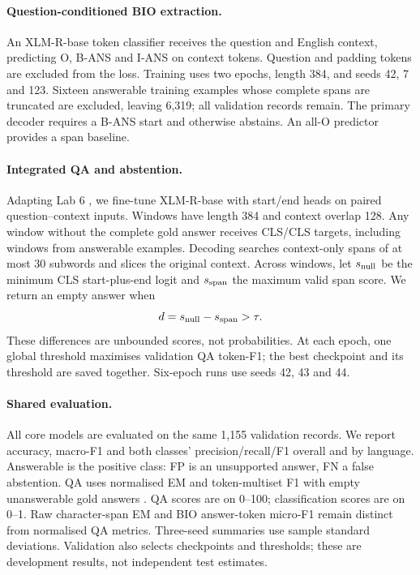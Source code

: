 \documentclass[11pt]{article}
\begin{document}
\paragraph{Question-conditioned BIO extraction.}
An XLM-R-base token classifier \citep{xlmr} receives the question and English context, predicting O, B-ANS and I-ANS on context tokens. Question and padding tokens are excluded from the loss. Training uses two epochs, length 384, and seeds 42, 7 and 123. Sixteen answerable training examples whose complete spans are truncated are excluded, leaving 6,319; all validation records remain. The primary decoder requires a B-ANS start and otherwise abstains. An all-O predictor provides a span baseline.

\paragraph{Integrated QA and abstention.}
Adapting Lab 6 \citep{lab6}, we fine-tune XLM-R-base with start/end heads on paired question--context inputs. Windows have length 384 and context overlap 128. Any window without the complete gold answer receives CLS/CLS targets, including windows from answerable examples. Decoding searches context-only spans of at most 30 subwords and slices the original context. Across windows, let $s_{\rm null}$ be the minimum CLS start-plus-end logit and $s_{\rm span}$ the maximum valid span score. We return an empty answer when
\begin{equation}
 d=s_{\rm null}-s_{\rm span}>\tau.
 \label{eq:null}
\end{equation}
These differences are unbounded scores, not probabilities. At each epoch, one global threshold maximises validation QA token-F1; the best checkpoint and its threshold are saved together. Six-epoch runs use seeds 42, 43 and 44.

\paragraph{Shared evaluation.}
All core models are evaluated on the same 1,155 validation records. We report accuracy, macro-F1 and both classes' precision/recall/F1 overall and by language. Answerable is the positive class: FP is an unsupported answer, FN a false abstention. QA uses normalised EM and token-multiset F1 with empty unanswerable gold answers \citep{squad2}. QA scores are on 0--100; classification scores are on 0--1. Raw character-span EM and BIO answer-token micro-F1 remain distinct from normalised QA metrics. Three-seed summaries use sample standard deviations. Validation also selects checkpoints and thresholds; these are development results, not independent test estimates.
\end{document}

